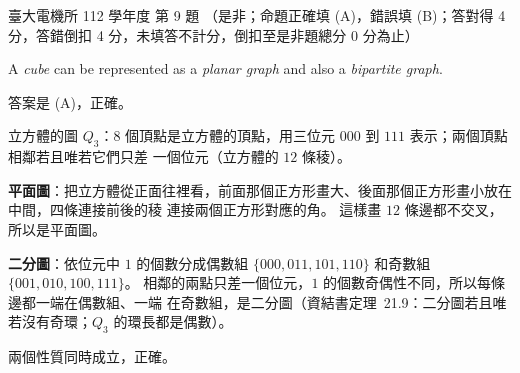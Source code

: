 \begin{pastexam}[label={px:ntu-112-ee-ds-09}]{臺大電機所 112 學年度 第 9 題}
（是非；命題正確填 (A)，錯誤填 (B)；答對得 4 分，答錯倒扣 4 分，未填答不計分，倒扣至是非題總分 0 分為止）

A \textit{cube} can be represented as a \textit{planar graph} and also a \textit{bipartite graph}.
\end{pastexam}

\begin{pastsoln}
答案是 (A)，正確。

立方體的圖 $Q_3$：$8$ 個頂點是立方體的頂點，用三位元 $000$ 到 $111$ 表示；兩個頂點相鄰若且唯若它們只差
一個位元（立方體的 $12$ 條稜）。

\textbf{平面圖}：把立方體從正面往裡看，前面那個正方形畫大、後面那個正方形畫小放在中間，四條連接前後的稜
連接兩個正方形對應的角。 這樣畫 $12$ 條邊都不交叉，所以是平面圖。

\textbf{二分圖}：依位元中 $1$ 的個數分成偶數組 $\{000, 011, 101, 110\}$ 和奇數組
$\{001, 010, 100, 111\}$。 相鄰的兩點只差一個位元，$1$ 的個數奇偶性不同，所以每條邊都一端在偶數組、一端
在奇數組，是二分圖（資結書定理~21.9：二分圖若且唯若沒有奇環；$Q_3$ 的環長都是偶數）。

兩個性質同時成立，正確。
\end{pastsoln}
